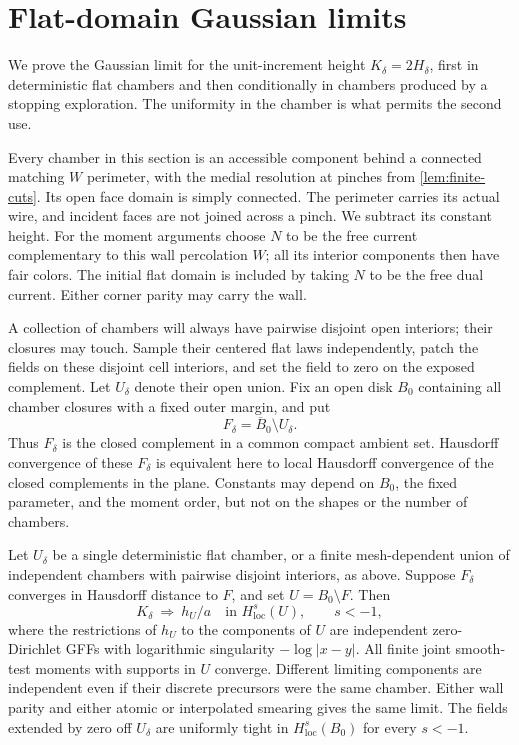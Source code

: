 \section{Flat-domain Gaussian limits}
\label{sec:gaussian}

We prove the Gaussian limit for the unit-increment height
\(K_\delta=2H_\delta\), first in deterministic flat chambers and then
conditionally in chambers produced by a stopping exploration. The uniformity
in the chamber is what permits the second use.

Every chamber in this section is an accessible component behind a connected
matching \(W\) perimeter, with the medial resolution at pinches from
\cref{lem:finite-cuts}. Its open face domain is simply connected. The
perimeter carries its actual wire, and incident faces are not joined across a
pinch. We subtract its constant height. For the moment arguments choose \(N\)
to be the free current complementary to this wall percolation \(W\); all its
interior components then have fair colors. The initial flat domain is
included by taking \(N\) to be the free dual current. Either corner parity
may carry the wall.

A collection of chambers will always have pairwise disjoint open interiors;
their closures may touch. Sample their centered flat laws independently,
patch the fields on these disjoint cell interiors, and set the field to zero
on the exposed complement. Let \(U_\delta\) denote their open union. Fix an
open disk \(B_0\) containing all chamber closures with a fixed outer margin,
and put
\[
             F_\delta=\overline B_0\setminus U_\delta.
\]
Thus \(F_\delta\) is the closed complement in a common compact ambient set.
Hausdorff convergence of these \(F_\delta\) is equivalent here to local
Hausdorff convergence of the closed complements in the plane. Constants may
depend on \(B_0\), the fixed parameter, and the moment order, but not on the
shapes or the number of chambers.

\begin{theorem}\label{thm:flat-gff}
Let \(U_\delta\) be a single deterministic flat chamber, or a finite
mesh-dependent union of independent chambers with pairwise disjoint
interiors, as above. Suppose \(F_\delta\) converges in Hausdorff distance to
\(F\), and set \(U=B_0\setminus F\). Then
\[
                K_\delta\ \Longrightarrow\ h_U/a
             \quad\text{in }H^s_{\mathrm{loc}}(U),\qquad s<-1,
\]
where the restrictions of \(h_U\) to the components of \(U\) are independent
zero-Dirichlet GFFs with logarithmic singularity \(-\log|x-y|\). All finite
joint smooth-test moments with supports in \(U\) converge. Different limiting
components are independent even if their discrete precursors were the same
chamber. Either wall parity and either atomic or interpolated smearing gives
the same limit. The fields extended by zero off \(U_\delta\) are uniformly
tight in \(H^s_{\mathrm{loc}}(B_0)\) for every \(s<-1\).
\end{theorem}

